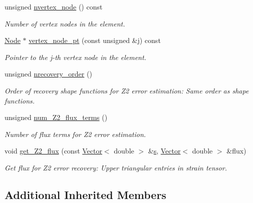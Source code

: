 \begin{DoxyCompactItemize}
unsigned \hyperlink{classoomph_1_1TLinearElasticityElement_a41f8db113faa5d948d8a3ec21f8111b4}{nvertex\+\_\+node} () const
\begin{DoxyCompactList}\small\item\em Number of vertex nodes in the element. \end{DoxyCompactList}\item 
\hyperlink{classoomph_1_1Node}{Node} $\ast$ \hyperlink{classoomph_1_1TLinearElasticityElement_a5a3dac9eae6f19eab21fc590264e64e4}{vertex\+\_\+node\+\_\+pt} (const unsigned \&j) const
\begin{DoxyCompactList}\small\item\em Pointer to the j-\/th vertex node in the element. \end{DoxyCompactList}\item 
unsigned \hyperlink{classoomph_1_1TLinearElasticityElement_a4e896fd9ef9e6d2efcefbb2b162925ff}{nrecovery\+\_\+order} ()
\begin{DoxyCompactList}\small\item\em Order of recovery shape functions for Z2 error estimation\+: Same order as shape functions. \end{DoxyCompactList}\item 
unsigned \hyperlink{classoomph_1_1TLinearElasticityElement_a1d2268113e23f9b46ee2ce1c18d836de}{num\+\_\+\+Z2\+\_\+flux\+\_\+terms} ()
\begin{DoxyCompactList}\small\item\em Number of \textquotesingle{}flux\textquotesingle{} terms for Z2 error estimation. \end{DoxyCompactList}\item 
void \hyperlink{classoomph_1_1TLinearElasticityElement_a6dd9de6d6ca3ede5624bd56d45c27445}{get\+\_\+\+Z2\+\_\+flux} (const \hyperlink{classoomph_1_1Vector}{Vector}$<$ double $>$ \&\hyperlink{cfortran_8h_ab7123126e4885ef647dd9c6e3807a21c}{s}, \hyperlink{classoomph_1_1Vector}{Vector}$<$ double $>$ \&flux)
\begin{DoxyCompactList}\small\item\em Get \textquotesingle{}flux\textquotesingle{} for Z2 error recovery\+: Upper triangular entries in strain tensor. \end{DoxyCompactList}\end{DoxyCompactItemize}
\subsection*{Additional Inherited Members}


